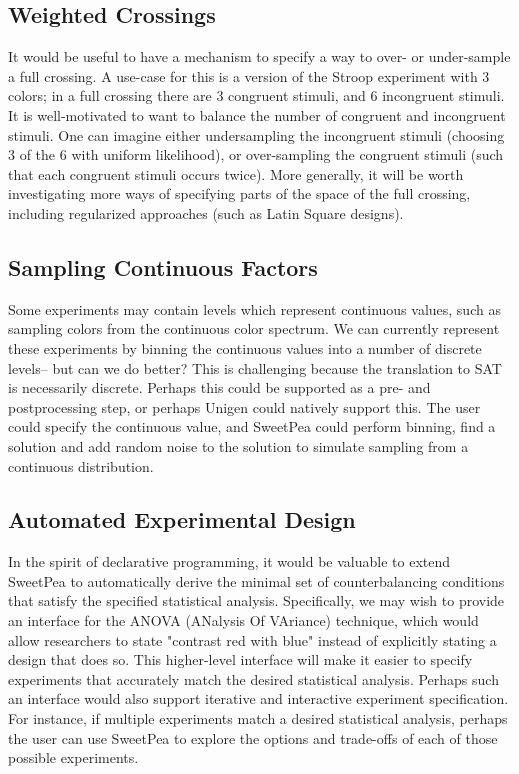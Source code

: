 \subsection{Weighted Crossings}
It would be useful to have a mechanism to specify a way to over- or under-sample a full crossing. A use-case for this is a version of the Stroop experiment with 3 colors; in a full crossing there are 3 congruent stimuli, and 6 incongruent stimuli. It is well-motivated to want to balance the number of congruent and incongruent stimuli. One can imagine either undersampling the incongruent stimuli (choosing 3 of the 6 with uniform likelihood), or over-sampling the congruent stimuli (such that each congruent stimuli occurs twice). More generally, it will be worth investigating more ways of specifying parts of the space of the full crossing, including regularized approaches (such as Latin Square designs).


\subsection{Sampling Continuous Factors}
Some experiments may contain levels which represent continuous values, such as sampling colors from the continuous color spectrum. We can currently represent these experiments by binning the continuous values into a number of discrete levels-- but can we do better? This is challenging because the translation to SAT is necessarily discrete. Perhaps this could be supported as a pre- and postprocessing step, or perhaps Unigen could natively support this. The user could specify the continuous value, and SweetPea could perform binning, find a solution and add random noise to the solution to simulate sampling from a continuous distribution.

\subsection{Automated Experimental Design}
In the spirit of declarative programming, it would be valuable to extend SweetPea to automatically derive the minimal set of counterbalancing conditions that satisfy the specified statistical analysis. Specifically, we may wish to provide an interface for the ANOVA (ANalysis Of VAriance) technique, which would allow researchers to state "contrast red with blue" instead of explicitly stating a design that does so. This higher-level interface will make it easier to specify experiments that accurately match the desired statistical analysis. Perhaps such an interface would also support iterative and interactive experiment specification. For instance, if multiple experiments match a desired statistical analysis, perhaps the user can use SweetPea to explore the options and trade-offs of each of those possible experiments.

